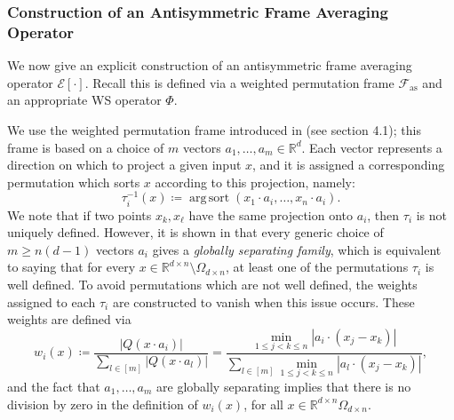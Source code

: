 \documentclass{amsart}
\theoremstyle{plain}
\theoremstyle{definition}
\theoremstyle{remark}
\DeclareMathOperator*{\argsort}{arg\,sort}
\newcommand{\RR}{\mathbb{R}}
\newcommand{\abs}[1]{\left\lvert#1\right\rvert}
\begin{document}
\subsubsection{Construction of an Antisymmetric Frame Averaging Operator} \label{sec:construction_afat}
We now give an explicit construction of an antisymmetric frame averaging operator $\mathcal{E}[\cdot]$. Recall this is defined via a weighted permutation frame $\mathcal{F}_{\text{as}}$ and an appropriate WS operator $\Phi$. 

We use the weighted permutation frame introduced in \cite{frames} (see section 4.1); this frame is based on a choice of $m$ vectors $a_1,\ldots,a_m \in \RR^d $. Each vector represents a direction on which to project a given input $x$, and it is assigned a corresponding permutation which sorts $x$ according to this projection, namely: 
\begin{equation} \label{eq:tau}
	 \tau_i^{-1}(x) \coloneq \argsort{\left(x_1 \cdot a_i, \dots, x_n \cdot a_i \right)}  .\end{equation}
We note that if two points $x_k,x_\ell$ have the same projection onto $a_i$, then $\tau_i$ is not uniquely defined. However, it is shown in \cite{frames} that every generic choice of $m\geq n(d-1) $ vectors $a_i$ gives a \emph{globally separating family}, which is equivalent to saying that for every $x\in \RR^{d\times n} \setminus \Omega_{d\times n}$, at least one of the permutations $\tau_i$ is well defined. To avoid permutations which are not well defined, the weights assigned to each $\tau_i$ are constructed to vanish when this issue occurs. These weights are  defined via
\begin{equation}\label{eq:w}
	w_i(x) \coloneq \frac{\abs{Q\left(x \cdot a_i \right)}}{\sum_{l \in [m]}{\abs{Q\left(x \cdot a_l \right)}}}=\frac{\min_{1\leq j<k\leq n} |a_i \cdot(x_j-x_k) |  }{\sum_{l\in[m]}\min_{1\leq j<k\leq n} |a_l \cdot(x_j-x_k) | },
\end{equation}
and the fact that $a_1,\ldots,a_m$ are globally separating implies that there is no division by zero in the definition of $w_i(x)$, for all $x \in \RR^{d\times n} \Omega_{d\times n}$. 
\end{document}
